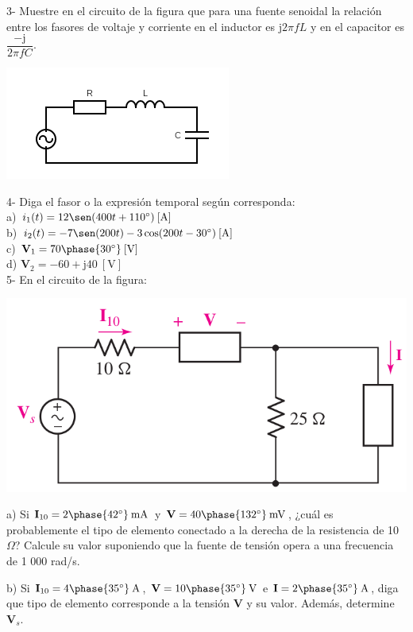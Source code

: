 \documentclass[10pt,letterpaper]{article}
\renewcommand{\sin}{\sen}
\begin{document}
3- Muestre en el circuito de la figura que para una fuente senoidal la relación entre los fasores de voltaje y corriente en el inductor es $\mathrm{j}2\pi fL$ y en el capacitor es $\dfrac{-\mathrm{j}}{2\pi fC}$.

\includegraphics[scale=0.61]{c3_1}

4- Diga el fasor o la expresión temporal según corresponda: \\

a) $i_1(t)=12\sin(400t+110^{\circ}) \: [\mathrm{A}]$ \\

b) $i_2(t)=-7\sen(200t)- 3\cos(200t - 30^{\circ}) \: [\mathrm{A}]$ \\

c) $\mathrm{\textbf{V}}_1 = 70 \phase{30^{\circ}} \: [\mathrm{V}] $ \\

d) $\mathrm{\textbf{V}}_2 =-60+\mathrm{j}40 \: [\mathrm{V}] $ \\

5- En el circuito de la figura:

\includegraphics[scale=0.4]{c5_1}

a) Si $\textbf{I}_{10}=2\phase{42^{\circ}} \: \mathrm{mA}$ y $\textbf{V}=40\phase{132^{\circ}} \: \mathrm{mV}$, ¿cuál es probablemente el tipo de elemento conectado a la derecha de la resistencia de 10 $\Omega$? Calcule su valor suponiendo que la fuente de tensión opera a una frecuencia de 1 000 rad/s.


b) Si $\textbf{I}_{10}=4\phase{35^{\circ}} \: \mathrm{A}$, $\textbf{V}=10\phase{35^{\circ}} \: \mathrm{V}$ e $\textbf{I}=2\phase{35^{\circ}} \: \mathrm{A}$, diga que tipo de elemento corresponde a la tensión $\textbf{V}$ y su valor. Además, determine $\textbf{V}_s$.
\\
\end{document}
